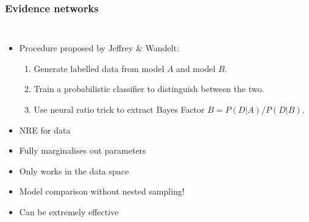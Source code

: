 \documentclass[aspectratio=169]{beamer}
\begin{document}
\begin{frame}
    \frametitle{Evidence networks~}
    \begin{columns}
    \begin{itemize}
        \item Procedure proposed by Jeffrey \& Wandelt:
            \begin{enumerate}
                \item Generate labelled data from model $A$ and model $B$.
                \item Train a probabilistic classifier to distinguish between the two.
                \item Use neural ratio trick to extract Bayes Factor $B = P(D|A)/P(D|B)$.
            \end{enumerate}
        \item NRE for data
        \item Fully marginalises out parameters
        \item Only works in the data space
        \item Model comparison without nested sampling!
        \item Can be extremely effective
    \end{itemize}
        

\end{columns}
\end{frame}
\end{document}
